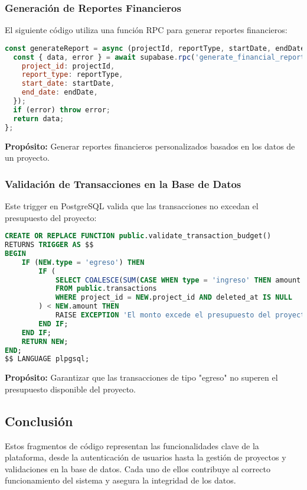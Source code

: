 \subsubsection{Generación de Reportes Financieros}
El siguiente código utiliza una función RPC para generar reportes financieros:
\begin{lstlisting}[language=JavaScript]
const generateReport = async (projectId, reportType, startDate, endDate) => {
  const { data, error } = await supabase.rpc('generate_financial_report', {
    project_id: projectId,
    report_type: reportType,
    start_date: startDate,
    end_date: endDate,
  });
  if (error) throw error;
  return data;
};
\end{lstlisting}
\textbf{Propósito:} Generar reportes financieros personalizados basados en los datos de un proyecto.

\subsubsection{Validación de Transacciones en la Base de Datos}
Este trigger en PostgreSQL valida que las transacciones no excedan el presupuesto del proyecto:
\begin{lstlisting}[language=SQL]
CREATE OR REPLACE FUNCTION public.validate_transaction_budget()
RETURNS TRIGGER AS $$
BEGIN
    IF (NEW.type = 'egreso') THEN
        IF (
            SELECT COALESCE(SUM(CASE WHEN type = 'ingreso' THEN amount ELSE -amount END), 0)
            FROM public.transactions
            WHERE project_id = NEW.project_id AND deleted_at IS NULL
        ) < NEW.amount THEN
            RAISE EXCEPTION 'El monto excede el presupuesto del proyecto.';
        END IF;
    END IF;
    RETURN NEW;
END;
$$ LANGUAGE plpgsql;
\end{lstlisting}
\textbf{Propósito:} Garantizar que las transacciones de tipo "egreso" no superen el presupuesto disponible del proyecto.

\subsection{Conclusión}
Estos fragmentos de código representan las funcionalidades clave de la plataforma, desde la autenticación de usuarios hasta la gestión de proyectos y validaciones en la base de datos. Cada uno de ellos contribuye al correcto funcionamiento del sistema y asegura la integridad de los datos.
